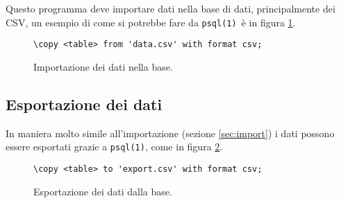 \documentclass[draft]{article}
\newcommand{\eng}[1]{\foreignlanguage{english}{#1}} %
\newcommand{\psql}{\texttt{psql(1)}}
\newcommand{\file}{\textit{file}}
\begin{document}
Questo programma deve importare dati nella base di dati, principalmente dei CSV,
un esempio di come si potrebbe fare da \psql\ è in figura \ref{fig:import}.

\begin{figure}
\centering\verb+\copy <table> from 'data.csv' with format csv;+
\caption{Importazione dei dati nella base.}
\label{fig:import}
\end{figure}

\subsection{Esportazione dei dati}

In maniera molto simile all'importazione (sezione \ref{sec:import}) i dati
possono essere esportati grazie a \psql, come in figura \ref{fig:export}.

\begin{figure}
\centering\verb+\copy <table> to 'export.csv' with format csv;+
\caption{Esportazione dei dati dalla base.}
\label{fig:export}
\end{figure}




\iffalse %
I dati saranno quindi presi in \eng{input} da tre \file\ CSV: uno per i dati
geografici, uno per quelli meteorologici e uno per lo stato iniziale
dell'incendio. Ognuno di questi file sarà corredato da un'altro CSV che ne
conterrà le informazioni sulla ``grana''.

Per permettere l'aggiornamento di questi dati durante la simulazione il
simulatore monitorerà la presenza di \file\ con nomi come \texttt{land.csv},
\texttt{meteo.csv} e \texttt{fire.csv}. Nel caso in cui uno di questi file sia
presente, dopo l'inizio della simulazione il simulatore provvederà a leggerli,
aggiornare il suo stato interno e cambiargli nome\footnote{con nomi tipo
\texttt{land\_<timestamp>.csv}} (o eliminarli) per evitare di rileggerli in
futuro.

Un implementazione ingenua della scrittura di questi file per l'aggiornamento
dei dati potrebbe generare una \eng{race-condition}, ovvero la lettura di
incompletidati, dato che la scrittura in un file non è atomica. Per evirate ciò
una strateggia potrebbe essere quella di scrivere i dati in file con nomi tipo
\texttt{tmpXXX} e una volta finito di scriverli si può usare \texttt{rename(2)},
che è atomica, per dargli il nome giusto. Questo metodo sarà anche usata per la
scrittura dei file.
\fi
\end{document}

